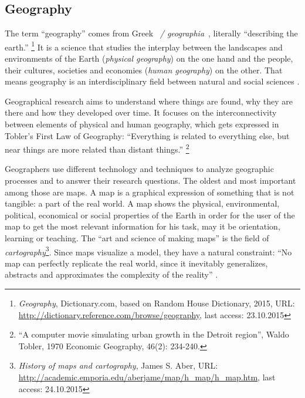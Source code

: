 
\subsection{Geography} %
\label{sub:geography}


The term ``geography'' comes from Greek ~\emph{\textgamma\textepsilon\textomega\textgamma\textrho\textalpha\textphi\textiota\textalpha / geographia}~, literally ``describing the earth.'' \footnote{
  \textit{Geography},
  Dictionary.com, based on Random House Dictionary, 2015,
  URL: \url{http://dictionary.reference.com/browse/geography},
  last access: 23.10.2015
}
It is a science that studies the interplay between the landscapes and environments of the Earth (\emph{physical geography}) on the one hand and the people, their cultures, societies and economies (\emph{human geography}) on the other. That means geography is an interdisciplinary field between natural and social sciences
\cite{rgsGeography}.

Geographical research aims to understand where things are found, why they are there and how they developed over time.
It focuses on the interconnectivity between elements of physical and human geography, which gets expressed in Tobler's First Law of Geography: ``Everything is related to everything else, but near things are more related than distant things.'' \footnote{
  ``A computer movie simulating urban growth in the Detroit region'',
  Waldo Tobler, 1970
  Economic Geography, 46(2): 234-240.
}

Geographers use different technology and techniques to analyze geographic processes and to answer their research questions. The oldest and most important among those are maps. A map is a graphical expression of something that is not tangible: a part of the real world. A map shows the physical, environmental, political, economical or social properties of the Earth in order for the user of the map to get the most relevant information for his task, may it be orientation, learning or teaching. The ``art and science of making maps'' is the field of \emph{cartography}\footnote{
  \textit{History of maps and cartography},
  James S. Aber,
  URL: \url{http://academic.emporia.edu/aberjame/map/h_map/h_map.htm},
  last access: 24.10.2015
}. Since maps visualize a model, they have a natural constraint: ``No map can perfectly replicate the real world, since it inevitably generalizes, abstracts and approximates the complexity of the reality''
\cite[p. 181]{knowles2008placing}.

